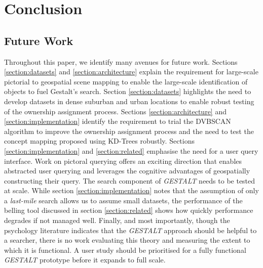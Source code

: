 \section{Conclusion}
\label{section:conclusion}

\subsection{Future Work}
Throughout this paper, we identify many avenues for future work. Sections \ref{section:datasets} and \ref{section:architecture} explain the requirement for large-scale pictorial to geospatial scene mapping to enable the large-scale identification of objects to fuel Gestalt's search. 
Section \ref{section:datasets} highlights the need to develop datasets in dense suburban and urban locations to enable robust testing of the ownership assignment process. 
Sections \ref{section:architecture} and \ref{section:implementation} identify the requirement to trial the DVBSCAN algorithm to improve the ownership assignment process and the need to test the concept mapping proposed using KD-Trees robustly.
Sections \ref{section:implementation} and \ref{section:related} emphasise the need for a user query interface. Work on pictoral querying offers an exciting direction that enables abstracted user querying and leverages the cognitive advantages of geospatially constructing their query. 
The search component of \textit{GESTALT} needs to be tested at scale. While section \ref{section:implementation} notes that the assumption of only a \textit{last-mile} search allows us to assume small datasets, the performance of the belling tool discussed in section \ref{section:related} shows how quickly performance degrades if not managed well.
Finally, and most importantly, though the psychology literature indicates that the \textit{GESTALT} approach should be helpful to a searcher, there is no work evaluating this theory and measuring the extent to which it is functional. A user study should be prioritised for a fully functional \textit{GESTALT} prototype before it expands to full scale.

